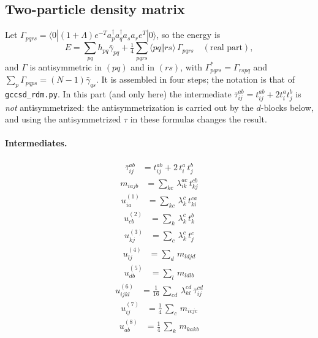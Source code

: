 \documentclass[11pt]{article}
\newcommand{\bra}[1]{\langle #1|}
\newcommand{\ket}[1]{|#1\rangle}
\newcommand{\anti}[4]{\langle #1#2\Vert #3#4\rangle}
\begin{document}
\subsection{Two-particle density matrix}

Let $\Gamma_{pqrs}=\bra{0}(1+\Lambda)e^{-T}a_p^\dagger a_q^\dagger a_s a_r e^{T}\ket{0}$, so the energy is
\begin{equation}
E=\sum_{pq}h_{pq}\bar\gamma_{pq}+\tfrac14\sum_{pqrs}\anti{p}{q}{r}{s}\,\Gamma_{pqrs}\quad(\text{real part}),
\end{equation}
and $\Gamma$ is antisymmetric in $(pq)$ and in $(rs)$, with $\Gamma_{pqrs}^{*}=\Gamma_{rspq}$ and
$\sum_p\Gamma_{pqps}=(N-1)\bar\gamma_{qs}$. It is assembled in four steps; the notation is that of \texttt{gccsd\_rdm.py}.
In this part (and only here) the intermediate $\bar\tau_{ij}^{ab}=t_{ij}^{ab}+2t_i^at_j^b$ is \emph{not} antisymmetrized:
the antisymmetrization is carried out by the $d$-blocks below, and using the antisymmetrized $\tau$ in these formulas
changes the result.

\paragraph{Intermediates.}
\begin{align*}
  \bar\tau_{ij}^{ab} &=  t_{ij}^{ab} + 2\, t_{i}^{a}\,t_{j}^{b}
\end{align*}
\begin{align*}
  m_{iajb} &=  \sum_{kc}\,\lambda_{ik}^{ac}\,t_{kj}^{cb}
\end{align*}
\begin{align*}
  u^{(1)}_{ia} &=  \sum_{kc}\,\lambda_{k}^{c}\,t_{ki}^{ca}
\end{align*}
\begin{align*}
  u^{(2)}_{cb} &=  \sum_{k}\,\lambda_{k}^{c}\,t_{k}^{b}
\end{align*}
\begin{align*}
  u^{(3)}_{kj} &=  \sum_{c}\,\lambda_{k}^{c}\,t_{j}^{c}
\end{align*}
\begin{align*}
  u^{(4)}_{lj} &=  \sum_{d}\,m_{ldjd}
\end{align*}
\begin{align*}
  u^{(5)}_{db} &=  \sum_{l}\,m_{ldlb}
\end{align*}
\begin{align*}
  u^{(6)}_{ijkl} &= \tfrac{1}{16}\, \sum_{cd}\,\lambda_{kl}^{cd}\,\bar\tau_{ij}^{cd}
\end{align*}
\begin{align*}
  u^{(7)}_{ij} &= \tfrac{1}{4}\, \sum_{c}\,m_{icjc}
\end{align*}
\begin{align*}
  u^{(8)}_{ab} &= \tfrac{1}{4}\, \sum_{k}\,m_{kakb}
\end{align*}
\end{document}
